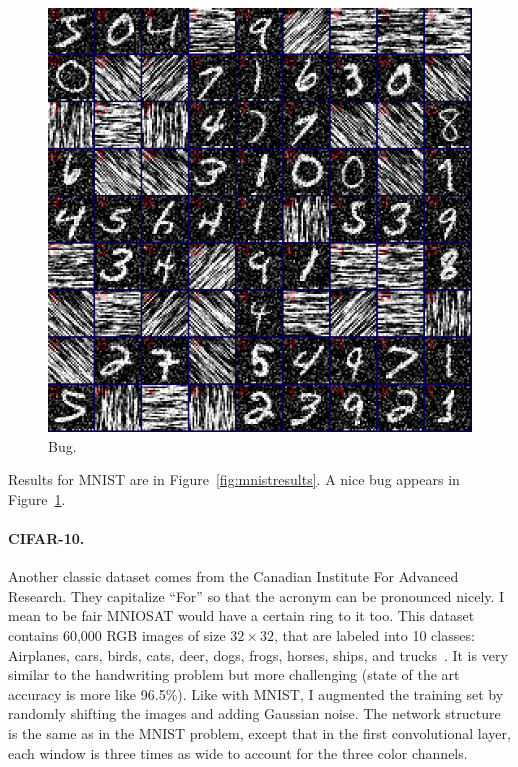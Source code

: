 \documentclass[twocolumn]{article}
\begin{document}
\begin{figure}[htp]
  \begin{center}
    \includegraphics[width=0.9 \linewidth]{mnist-bug}
  \end{center}
  \caption{
    Bug.
  } \label{fig:mnistbug}
\end{figure}

Results for MNIST are in Figure~\ref{fig:mnistresults}.
A nice bug appears in Figure~\ref{fig:mnistbug}.

\paragraph{CIFAR-10.}
Another classic dataset comes from the Canadian Institute For Advanced
Research. They capitalize ``For'' so that the acronym can be
pronounced nicely. I mean to be fair MNIOSAT would have a certain ring
to it too. This dataset contains 60,000 RGB images of size $32 \times 32$, that
are labeled into 10 classes: Airplanes, cars, birds, cats, deer, dogs,
frogs, horses, ships, and trucks~\cite{krizhevsky2009learning}. It is
very similar to the handwriting problem but more challenging (state of
the art accuracy is more like 96.5\%). Like with MNIST, I augmented the
training set by randomly shifting the images and adding Gaussian
noise. The network structure is the same as in the MNIST problem,
except that in the first convolutional layer, each window is three
times as wide to account for the three color channels.
\end{document}

